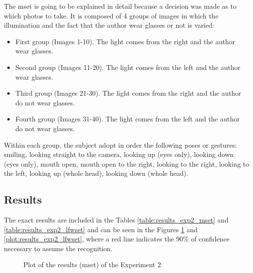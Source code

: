 	The \gls{mset} is going to be explained in detail because a decision was made as to which photos to take. It is composed of 4 groups of images in which the illumination and the fact that the author wear glasses or not is varied:

	\begin{itemize}
		\item First group (Images 1-10). The light comes from the right and the author wear glasses.
		\item Second group (Images 11-20). The light comes from the left and the author wear glasses.
		\item Third group (Images 21-30). The light comes from the right and the author do not wear glasses.
		\item Fourth group (Images 31-40). The light comes from the left and the author do not wear glasses.
	\end{itemize}

	Within each group, the subject adopt in order the following poses or gestures: smiling, looking straight to the camera, looking up (eyes only), looking down (eyes only), mouth open, mouth open to the right, looking to the right, looking to the left, looking up (whole head), looking down (whole head).

	\subsection{Results}
	The exact results are included in the Tables \ref{table:results_exp2_mset} and \ref{table:results_exp2_lfwset} and can be seen in the Figures \ref{plot:results_exp2_mset} and \ref{plot:results_exp2_lfwset}, where a red line indicates the 90\% of confidence necessary to assume the recognition.

	\begin{figure}[p]
		\centering
		\resizebox{\textwidth}{!}
		{		
		}
		\caption{Plot of the results (\gls{mset}) of the Experiment 2}
		\label{plot:results_exp2_mset}
	\end{figure}

